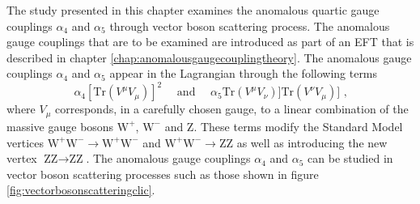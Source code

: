 The study presented in this chapter examines the anomalous quartic gauge couplings $\alpha_{4}$ and $\alpha_{5}$ through vector boson scattering process.  The anomalous gauge couplings that are to be examined are introduced as part of an EFT that is described in chapter \ref{chap:anomalousgaugecouplingtheory}.  The anomalous gauge couplings $\alpha_{4}$ and $\alpha_{5}$ appear in the Lagrangian through the following terms
%
\begin{equation}
\alpha_{4}[\text{Tr}(V^{\mu}V_{\mu})]^{2} \quad \text{ and } \quad \alpha_{5}\text{Tr}(V^{\mu}V_{\nu})] \text{Tr}(V^{\nu}V_{\mu})]\text{ ,}
\end{equation}
%
\noindent where $V_{\mu}$ corresponds, in a carefully chosen gauge, to a linear combination of the massive gauge bosons $\text{W}^{+}$, $\text{W}^{-}$ and Z.  These terms modify the Standard Model vertices $\text{W}^{+}\text{W}^{-} \rightarrow \text{W}^{+}\text{W}^{-}$ and $\text{W}^{+}\text{W}^{-} \rightarrow \text{Z}\text{Z}$ as well as introducing the new vertex $\text{Z}\text{Z} \rightarrow \text{Z}\text{Z}$.  The anomalous gauge couplings $\alpha_{4}$ and $\alpha_{5}$ can be studied in vector boson scattering processes such as those shown in figure \ref{fig:vectorbosonscatteringclic}.  


